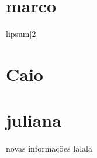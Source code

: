 
    \section{marco}
    lipsum[2]
    \section{Caio}
    \section{juliana}
    novas informações
    lalala

